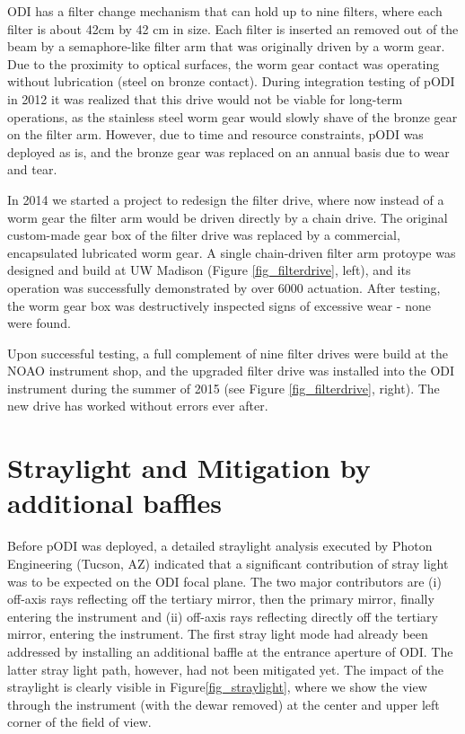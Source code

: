 \documentclass[]{spieman}
\begin{document}
ODI has a filter change mechanism that can hold up to nine filters, where each
filter is about 42cm by 42 cm in size. Each filter is inserted an removed out of
the beam by a semaphore-like filter arm that was originally driven by a worm
gear\cite{Muller2008}. Due to the proximity to optical surfaces, the worm gear
contact was operating without lubrication (steel on bronze contact). 
During integration testing of pODI in 2012 it was realized that this drive would not 
be viable for long-term operations, as the stainless steel worm gear would slowly
shave of the bronze gear on the filter arm. However, due to time and resource
constraints, pODI was deployed as is, and the bronze gear was replaced on an annual basis
due to wear and tear.


In 2014 we  started a project to redesign the filter drive, where now 
instead of a worm gear the filter arm would be driven directly by a chain 
drive. The original custom-made gear box of the filter drive was replaced by a commercial, 
encapsulated lubricated worm gear. A single chain-driven filter arm protoype was designed and build
at UW Madison (Figure \ref{fig_filterdrive}, left), and its operation was  successfully demonstrated 
by  over 6000 actuation. After testing, the worm gear box was destructively inspected signs of 
excessive wear - none  were found. 
 
Upon successful testing, a full complement of nine filter drives were build at 
the NOAO instrument shop, and the upgraded filter drive was installed into the 
ODI instrument during the summer of 2015 (see Figure \ref{fig_filterdrive}, 
right). The new drive has worked without  errors ever after. 



\section{Straylight and Mitigation by additional baffles}

Before pODI was deployed, a detailed straylight analysis executed by Photon Engineering (Tucson, AZ)
indicated that a significant contribution of  stray light was to be expected on the ODI focal plane.
The two major contributors are (i) off-axis rays
reflecting off the tertiary mirror, then the primary mirror, finally entering
the instrument and (ii) off-axis rays reflecting directly off the tertiary mirror,
entering the instrument. The first stray light mode had already been addressed
by installing an additional baffle at the entrance aperture of ODI. The latter
stray light path, however, had not been mitigated yet. The impact of the
straylight is clearly visible in Figure\ref{fig_straylight}, where we show the
view through the instrument (with the dewar removed) at the center and upper left corner of the field of view.
\end{document}
